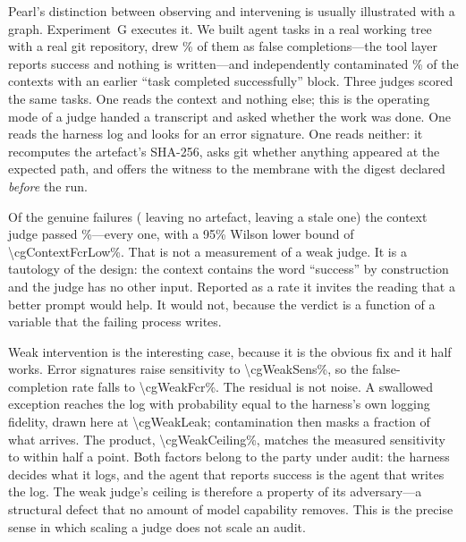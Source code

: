 \documentclass[conference]{IEEEtran}
\theoremstyle{definition}
\begin{document}
Pearl's distinction \cite{pearl2009} between observing and intervening is usually
illustrated with
a graph. Experiment~G executes it. We built \cgTasks{} agent tasks in a real working
tree with a real git repository, drew \cgFalseCompletionPct\% of them as false
completions---the tool layer reports success and nothing is written---and
independently contaminated \cgPollutionPct\% of the contexts with an earlier
``task completed successfully'' block. Three judges scored the same tasks. One
reads the context and nothing else; this is the operating mode of a judge handed a
transcript and asked whether the work was done. One reads the harness log and
looks for an error signature. One reads neither: it recomputes the artefact's
SHA-256, asks git whether anything appeared at the expected path, and offers the
witness to the membrane with the digest declared \emph{before} the run.

Of the \cgFailures{} genuine failures (\cgAbsent{} leaving no artefact,
\cgStale{} leaving a stale one) the context judge passed \cgContextFcr{}\%---every
one, with a \num{95}\% Wilson lower bound of \num{\cgContextFcrLow}\%. That is not
a measurement of a weak judge. It is a tautology of the design: the context
contains the word ``success'' by construction and the judge has no other input.
Reported as a rate it invites the reading that a better prompt would help. It
would not, because the verdict is a function of a variable that the failing
process writes.

Weak intervention is the interesting case, because it is the obvious fix and it
half works. Error signatures raise sensitivity to \num{\cgWeakSens}\%, so the
false-completion rate falls to \num{\cgWeakFcr}\%. The residual is not noise. A
swallowed exception reaches the log with probability equal to the harness's own
logging fidelity, drawn here at \num{\cgWeakLeak}; contamination then masks a
fraction of what arrives. The product, \num{\cgWeakCeiling}\%, matches the measured
sensitivity to within half a point. Both factors belong to the party under audit:
the harness decides what it logs, and the agent that reports success is the agent
that writes the log. The weak judge's ceiling is therefore a property of its
adversary---a structural defect that no amount of model capability removes. This
is the precise sense in which scaling a judge does not scale an audit.
\end{document}
